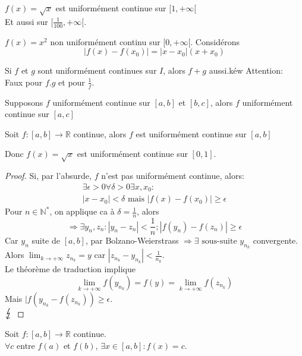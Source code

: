 \documentclass[../main.tex]{subfiles}
\begin{document}
\begin{exemple}
	$f( x) = \sqrt{x}$ est uniformément continue sur $[1, + \infty [ $ \\
	Et aussi sur $[\frac{1}{100}, + \infty[ $.
\end{exemple}
\begin{exemple}
	$f( x) = x^{2}$ non uniformément continu sur $[0,+ \infty[$. Considérons
	\[ 
		|f( x) - f( x_0) | = |x-x_0| ( x+x_0) 
	\]
	
\end{exemple}
\begin{propo}
Si $f$ et $g$ sont uniformément continues sur $I$, alors $f+g$ aussi.kéw
Attention:\\
Faux pour $f.g$ et pour $\frac{1}{f}$.
\end{propo}
\begin{exo}
	Supposons $f$ uniformément continue sur $[a,b]$ et $ [ b,c ] $, alors $f$ uniformément continue sur $[a,c]$
\end{exo}
\begin{thm}
	Soit $f: [ a,b] \to \mathbb{R}$ continue, alors $f$ est uniformément continue sur $[a,b]$
\end{thm}
\begin{rmq}
	Donc $f( x) = \sqrt x$ est uniformément continue sur $[0,1]$.
\end{rmq}
\begin{proof}
Si, par l'absurde, $f$ n'est pas uniformément continue, alors: 
\begin{align*}
\exists \epsilon > 0 \forall \delta> 0 \exists x,x_0:\\
|x-x_0|< \delta \text{ mais }  |f( x) - f( x_0) | \geq \epsilon
\end{align*}
Pour $n \in \mathbb{N}^{*}$, on applique ca à $\delta = \frac{1}{n}$, alors
\[ 
	\Rightarrow \exists y_n, z_n : |y_n - z_n| < \frac{1}{n}; |f( y_n)  - f( z_n) | \geq \epsilon
\]
Car $y_n$ suite de $[a,b]$, par Bolzano-Weierstrass $\Rightarrow \exists \text{ sous-suite } y_{n_k} $ convergente.\\
Alors $ \lim_{k \to  + \infty} z_{n_k} = y$ car $|z_{n_k} - y_{n_k} | < \frac{1}{n_k}$.\\
Le théorème de traduction implique
\[ 
	\lim_{k \to  + \infty} f( y_{n_k}  ) = f( y) = \lim_{k \to  + \infty} f( z_{n_k} ) 
\]
Mais $|f ( y_{n_k} - f( z_{n_k} ) ) \geq \epsilon$.\\
$\contra$
\end{proof}
\begin{thm}
Soit $f: [ a,b] \to \mathbb{R}$ continue.\\
$\forall c$ entre $f( a) $ et $f( b) $, $\exists x \in [a,b] : f( x) = c$.
\end{thm}
\end{document}
